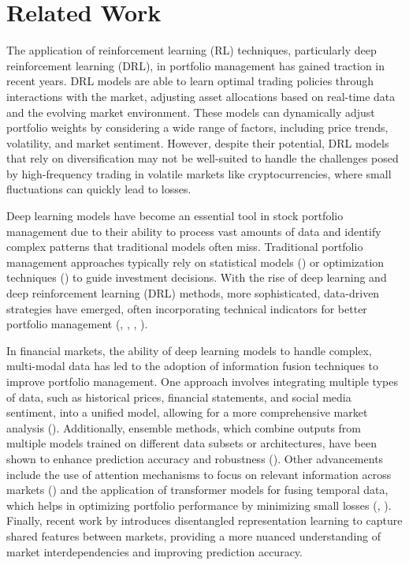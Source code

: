 \section{Related Work}

The application of reinforcement learning (RL) techniques, particularly deep reinforcement learning (DRL), in portfolio management has gained traction in recent years. DRL models are able to learn optimal trading policies through interactions with the market, adjusting asset allocations based on real-time data and the evolving market environment. These models can dynamically adjust portfolio weights by considering a wide range of factors, including price trends, volatility, and market sentiment. However, despite their potential, DRL models that rely on diversification may not be well-suited to handle the challenges posed by high-frequency trading in volatile markets like cryptocurrencies, where small fluctuations can quickly lead to losses.


Deep learning models have become an essential tool in stock portfolio management due to their ability to process vast amounts of data and identify complex patterns that traditional models often miss. Traditional portfolio management approaches typically rely on statistical models (\citet{li2012pamr}) or optimization techniques (\citet{pennanen2012introduction}) to guide investment decisions. With the rise of deep learning and deep reinforcement learning (DRL) methods, more sophisticated, data-driven strategies have emerged, often incorporating technical indicators for better portfolio management (\citet{ayala2021technical}, \citet{agrawal2022stock}, \citet{taghian2021reinforcement}, \citet{taghian2022learning}).

In financial markets, the ability of deep learning models to handle complex, multi-modal data has led to the adoption of information fusion techniques to improve portfolio management. One approach involves integrating multiple types of data, such as historical prices, financial statements, and social media sentiment, into a unified model, allowing for a more comprehensive market analysis (\citet{asadi4423354multi}). Additionally, ensemble methods, which combine outputs from multiple models trained on different data subsets or architectures, have been shown to enhance prediction accuracy and robustness (\citet{carta2021multi}). Other advancements include the use of attention mechanisms to focus on relevant information across markets (\citet{zhao2022stock}) and the application of transformer models for fusing temporal data, which helps in optimizing portfolio performance by minimizing small losses (\citet{gullotto2021portfolio}, \citet{kisiel2022portfolio}). Finally, recent work by \citet{abdulsahib2024cross} introduces disentangled representation learning to capture shared features between markets, providing a more nuanced understanding of market interdependencies and improving prediction accuracy.

